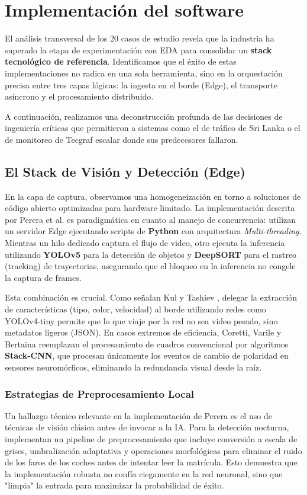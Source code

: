 \section{Implementación del software}

El análisis transversal de los 20 casos de estudio revela que la industria ha superado la etapa de experimentación con EDA para consolidar un \textbf{stack tecnológico de referencia}. Identificamos que el éxito de estas implementaciones no radica en una sola herramienta, sino en la orquestación precisa entre tres capas lógicas: la ingesta en el borde (Edge), el transporte asíncrono y el procesamiento distribuido.

A continuación, realizamos una deconstrucción profunda de las decisiones de ingeniería críticas que permitieron a sistemas como el de tráfico de Sri Lanka \cite{perera2024traffic} o el de monitoreo de Tecgraf \cite{laigner2020monolithic} escalar donde sus predecesores fallaron.

\subsection{El Stack de Visión y Detección (Edge)}
En la capa de captura, observamos una homogeneización en torno a soluciones de código abierto optimizadas para hardware limitado. La implementación descrita por Perera et al. \cite{perera2024traffic} es paradigmática en cuanto al manejo de concurrencia: utilizan un servidor Edge ejecutando scripts de \textbf{Python} con arquitectura \textit{Multi-threading}. Mientras un hilo dedicado captura el flujo de video, otro ejecuta la inferencia utilizando \textbf{YOLOv5} para la detección de objetos y \textbf{DeepSORT} para el rastreo (tracking) de trayectorias, asegurando que el bloqueo en la inferencia no congele la captura de frames.

Esta combinación es crucial. Como señalan Kul y Tashiev \cite{kul2021microservices}, delegar la extracción de características (tipo, color, velocidad) al borde utilizando redes como YOLOv4-tiny permite que lo que viaje por la red no sea video pesado, sino metadatos ligeros (JSON). En casos extremos de eficiencia, Coretti, Varile y Bertaina \cite{coretti2025neuromorphic} reemplazan el procesamiento de cuadros convencional por algoritmos \textbf{Stack-CNN}, que procesan únicamente los eventos de cambio de polaridad en sensores neuromórficos, eliminando la redundancia visual desde la raíz.

\subsubsection{Estrategias de Preprocesamiento Local}
Un hallazgo técnico relevante en la implementación de Perera es el uso de técnicas de visión clásica antes de invocar a la IA. Para la detección nocturna, implementan un pipeline de preprocesamiento que incluye conversión a escala de grises, umbralización adaptativa y operaciones morfológicas para eliminar el ruido de los faros de los coches antes de intentar leer la matrícula. Esto demuestra que la implementación robusta no confía ciegamente en la red neuronal, sino que "limpia" la entrada para maximizar la probabilidad de éxito.

